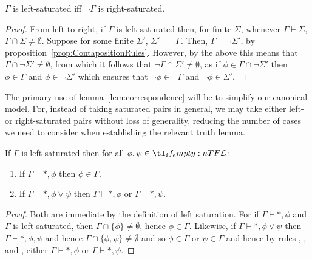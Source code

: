 \documentclass[10pt]{article}
\begin{document}
\begin{lemma}[Correspondence]\label{lem:correspondence}
  \(\Gamma\) is left-saturated iff \(\lnot\Gamma\) is right-saturated.
  \begin{proof}
    From left to right, if \(\Gamma\) is left-saturated then, for finite \(\Sigma\), whenever \(\Gamma \vdash \Sigma\), \(\Gamma \cap \Sigma \ne \emptyset\).
    Suppose for some finite \(\Sigma'\), \(\Sigma' \vdash \lnot\Gamma\).
    Then, \(\Gamma \vdash \lnot\Sigma'\), by proposition~\ref{prop:ContapositionRules}.
    However, by the above this means that \(\Gamma \cap \lnot\Sigma' \ne \emptyset\), from which it follows that \(\lnot\Gamma \cap \Sigma' \ne \emptyset\), as if \(\phi \in \Gamma \cap \lnot\Sigma'\) then \(\phi \in \Gamma\) and \(\phi \in \lnot\Sigma'\) which ensures that \(\lnot\phi \in \lnot\Gamma\) and \(\lnot\phi \in \Sigma'\).
  \end{proof}
\end{lemma}

The primary use of lemma~\ref{lem:correspondence} will be to simplify our canonical model.
For, instead of taking saturated pairs in general, we may take either left- or right-saturated pairs without loss of generality, reducing the number of cases we need to consider when establishing the relevant truth lemma.

\begin{proposition}
  If \(\Gamma\) is left-saturated then for all \(\phi,\psi \in \olang{}\):
  \begin{enumerate}
  \item If \(\Gamma \vdash \ast, \phi\) then \(\phi \in \Gamma\).
  \item If \(\Gamma \vdash \ast, \phi \lor \psi\) then \(\Gamma \vdash \ast, \phi\) or \(\Gamma \vdash \ast, \psi\).
  \end{enumerate}
  \begin{proof}
    Both are immediate by the definition of left saturation.
    For if \(\Gamma \vdash \ast, \phi\) and \(\Gamma\) is left-saturated, then \(\Gamma \cap \{\phi\} \ne \emptyset\), hence \(\phi \in \Gamma\).
    Likewise, if \(\Gamma \vdash \ast, \phi \lor \psi\) then \(\Gamma \vdash \ast, \phi, \psi\) and hence \(\Gamma \cap \{\phi,\psi\} \ne \emptyset\) and so \(\phi \in \Gamma\) or \(\psi \in \Gamma\) and hence by rules , , and , either \(\Gamma \vdash \ast,\phi\) or \(\Gamma \vdash \ast, \psi\).
  \end{proof}
\end{proposition}
\end{document}
